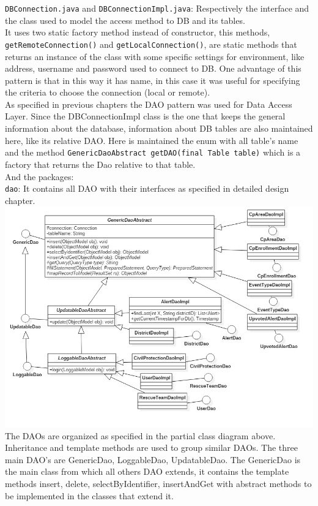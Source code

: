 \documentclass[a4paper,12pt]{report}
\begin{document}
\texttt{DBConnection.java} and \texttt{DBConnectionImpl.java}: Respectively the interface and the class used to model the access method to DB and its tables.\\
It uses two static factory method instead of constructor, this methods, \\ \texttt{getRemoteConnection()} and \texttt{getLocalConnection()}, are static methods that returns an instance of the class with some specific settings for environment, like address, username and password used to connect to DB. One advantage of this pattern is that in this way it has name, in this case it was useful for specifying the criteria to choose the connection (local or remote).\\
As specified in previous chapters the DAO pattern was used for Data Access Layer. Since the DBConnectionImpl class is the one that keeps the general information about the database, information about DB tables are also maintained here, like its relative DAO. Here is maintained the enum with all table's name and the method \texttt{GenericDaoAbstract getDAO(final Table table)} which is a factory that returns the Dao relative to that table.\\

And the packages:\\

\texttt{dao}: It contains all DAO with their interfaces as specified in detailed design chapter.\\
\includegraphics[width=\textwidth]{figures/ClassDiagram.jpg}
The DAOs are organized as specified in the partial class diagram above. Inheritance and template methods are used to group similar DAOs. The three main DAO's are GenericDao, LoggableDao, UpdatableDao. The GenericDao is the main class from which all others DAO extends, it contains the template methods insert, delete, selectByIdentifier, insertAndGet with abstract methods to be implemented in the classes that extend it.
\end{document}
